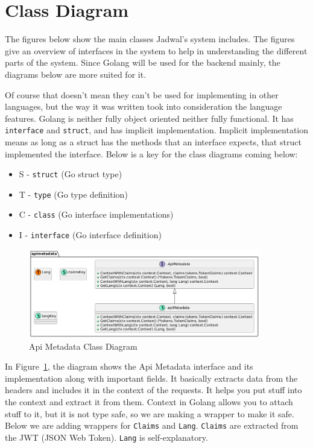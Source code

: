 \section{Class Diagram}

The figures below show the main classes Jadwal's system includes. The figures give an overview of interfaces in the system to help in understanding the different parts of the system. Since Golang will be used for the backend mainly, the diagrams below are more suited for it.

Of course that doesn't mean they can't be used for implementing in other languages, but the way it was written took into consideration the language features. Golang is neither fully object oriented neither fully functional. It has \texttt{interface} and \texttt{struct}, and has implicit implementation. Implicit implementation means as long as a struct has the methods that an interface expects, that struct implemented the interface. Below is a key for the class diagrams coming below:
\begin{itemize}
    \item S - \texttt{struct} (Go struct type)
    \item T - \texttt{type} (Go type definition)
    \item C - \texttt{class} (Go interface implementations)
    \item I - \texttt{interface} (Go interface definition)
\end{itemize}

\begin{figure}[!h]
    \centering
    \includegraphics[width=0.9\textwidth]{images/docs/diagrams/class/class-diagram/apimetadata.png}
    \caption{Api Metadata Class Diagram}
    \label{fig:api-metadata-class-diagram}
\end{figure}

In Figure~\ref{fig:api-metadata-class-diagram}, the diagram shows the Api Metadata interface and its implementation along with important fields. It basically extracts data from the headers and includes it in the context of the requests. It helps you put stuff into the context and extract it from them. Context in Golang allows you to attach stuff to it, but it is not type safe, so we are making a wrapper to make it safe. Below we are adding wrappers for \texttt{Claims} and \texttt{Lang}. \texttt{Claims} are extracted from the JWT (JSON Web Token). \texttt{Lang} is self-explanatory.



